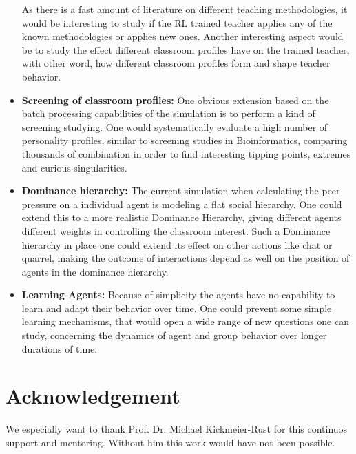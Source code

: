 \begin{itemize}
    \bb

    As there is a fast amount of literature on different teaching methodologies,
    it would be interesting to study if the RL trained teacher applies any of the known
    methodologies or applies new ones. Another interesting aspect would be to study the
    effect different classroom profiles have on the trained teacher, with other
    word, how different classroom profiles form and shape teacher behavior.

    \item \textbf{Screening of classroom profiles:} One obvious extension based
    on the batch processing capabilities of the simulation is to perform a kind
    of screening studying. One would systematically evaluate a high number of personality
    profiles, similar to screening studies in Bioinformatics, comparing thousands
    of combination in order to find interesting tipping points, extremes and curious
    singularities.

    \item \textbf{Dominance hierarchy:} The current simulation when calculating
    the peer pressure on a individual agent is modeling a flat social hierarchy.
    One could extend this to a more realistic Dominance Hierarchy, giving different
    agents different weights in controlling the classroom interest. Such a Dominance
    hierarchy in place one could extend its effect on other actions like chat or
    quarrel, making the outcome of interactions depend as well on the position
    of agents in the dominance hierarchy.

    \item \textbf{Learning Agents:} Because of simplicity the agents have no capability
    to learn and adapt their behavior over time. One could prevent some simple learning
    mechanisms, that would open a wide range of new questions one can study, concerning
    the dynamics of agent and group behavior over longer durations of time.
\end{itemize}

\section{Acknowledgement}
We especially want to thank Prof. Dr. Michael Kickmeier-Rust for this continuos
support and mentoring. Without him this work would have not been possible.
